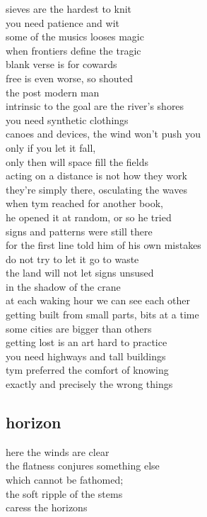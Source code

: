 \documentclass{article}
\begin{document}
sieves are the hardest to knit\\
you need patience and wit\\
some of the musics looses magic\\
when frontiers define the tragic\\
blank verse is for cowards\\
free is even worse, so shouted\\
the post modern man\\

intrinsic to the goal are the river's shores\\
you need synthetic clothings\\
canoes and devices, the wind won't push you\\
only if you let it fall,\\
only then will space fill the fields\\
acting on a distance is not how they work\\
they're simply there, osculating the waves\\

when tym reached for another book,\\
he opened it at random, or so he tried\\
signs and patterns were still there\\
for the first line told him of his own mistakes\\
do not try to let it go to waste\\
the land will not let signs unsused\\
in the shadow of the crane\\
at each waking hour we can see each other\\
getting built from small parts, bits at a time\\
some cities are bigger than others\\
getting lost is an art hard to practice\\
you need highways and tall buildings\\
tym preferred the comfort of knowing\\
exactly and precisely the wrong things
\clearpage

\subsection{horizon}

here the winds are clear\\
the flatness conjures something else\\
which cannot be fathomed;\\
the soft ripple of the stems\\
caress the horizons\\
\end{document}
